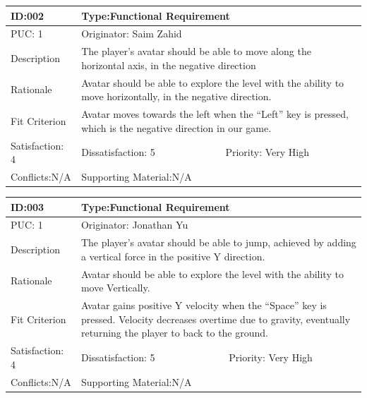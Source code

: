 \documentclass{article}
\begin{document}
	\begin{table}[H]
		\begin{tabular}{|l|l|l|}
			\hline
			ID:002&\multicolumn{2}{l|}{Type:Functional Requirement} \\ \hline
			PUC: 1& \multicolumn{2}{l|}{Originator: Saim Zahid} \\ \hline
			Description & \multicolumn{2}{m{0.85\textwidth}|}{The player’s avatar should be able to move along the horizontal axis, in the negative direction }\\\hline
			Rationale & \multicolumn{2}{m{0.85\textwidth}|}{Avatar should be able to explore the level with the ability to move horizontally, in the negative direction.} \\ \hline
			Fit Criterion & \multicolumn{2}{m{0.85\textwidth}|}{Avatar moves towards the left when the “Left” key is pressed, which is the negative direction in our game.} \\ \hline
			Satisfaction: 4 & Dissatisfaction: 5 & Priority: Very High \\ \hline
			Conflicts:N/A & \multicolumn{2}{l|}{Supporting Material:N/A} \\ \hline
		\end{tabular}
	\end{table}



	\begin{table}[H]
		\begin{tabular}{|l|l|l|}
			\hline
			ID:003&\multicolumn{2}{l|}{Type:Functional Requirement} \\ \hline
			PUC: 1& \multicolumn{2}{l|}{Originator: Jonathan Yu} \\ \hline
			Description & \multicolumn{2}{m{0.85\textwidth}|}{The player’s avatar should be able to jump, achieved by adding a vertical force in the positive Y direction.}\\\hline
			Rationale & \multicolumn{2}{m{0.85\textwidth}|}{Avatar should be able to explore the level with the ability to move Vertically.} \\ \hline
			Fit Criterion & \multicolumn{2}{m{0.85\textwidth}|}{Avatar gains positive Y velocity when the “Space” key is pressed. Velocity decreases overtime due to gravity, eventually returning the player to back to the ground.} \\ \hline
			Satisfaction: 4 & Dissatisfaction: 5 & Priority: Very High \\ \hline
			Conflicts:N/A & \multicolumn{2}{l|}{Supporting Material:N/A} \\ \hline
		\end{tabular}
	\end{table}
\end{document}
